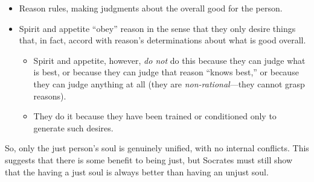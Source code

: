 \documentclass[oneside]{article}
\begin{document}
\begin{itemize}
\item{Reason rules, making judgments about the overall good for the person.}
\item{Spirit and appetite ``obey'' reason in the sense that they only desire things that, in fact, accord with reason's determinations about what is good overall.}
\begin{itemize}
\item{Spirit and appetite, however, \emph{do not} do this because they can judge what is best, or because they can judge that reason ``knows best,'' or because they can judge anything at all (they are \emph{non-rational}---they cannot grasp reasons).}
\item{They do it because they have been trained or conditioned only to generate such desires.}
\end{itemize}\end{itemize}

\noindent So, only the just person's soul is genuinely unified, with no internal conflicts. This suggests that there is some benefit to being just, but Socrates must still show that the having a just soul is always better than having an unjust soul. 

\end{document}
